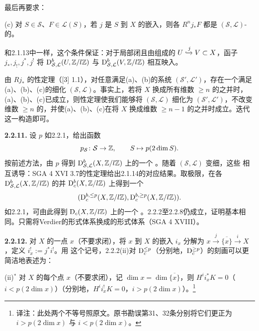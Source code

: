 最后再要求：

(c) 对 $S\in\mathcal S$、$F\in\mathcal L(S)$，若 $j$ 是 $S$ 到 $X$ 的嵌入，则各 $R^nj_*F$ 都是 $(\mathcal S,\mathcal L)$-的。

和2.1.13中一样，这个条件保证：对于局部闭且由组成的 $U\xhookrightarrow{j}V\subset X$，函子 $j_*,j_!,j^*,j^!$ 将 $\mathrm{D}_{\mathcal S,\mathcal L}^b(U,\mathbb Z/l\mathbb Z)$ 与 $\mathrm{D}_{\mathcal S,\mathcal L}^b(V,\mathbb Z/l\mathbb Z)$ 相互映入。

由 $Rj_*$ 的性定理（[3] 1.1），对任意满足(a)、(b)的系统 $(\mathcal S',\mathcal L')$，存在一个满足(a)、(b)、(c)的细化 $(\mathcal S,\mathcal L)$。事实上，若将 $X$ 换成所有维数 $\geq n$ 的之并时，(a)、(b)、(c)已成立，则性定理使我们能够将 $(\mathcal S,\mathcal L)$ 细化为 $(\mathcal S',\mathcal L')$，不改变维数 $\geq n$ 的，并使(a)、(b)、(c)在将 $X$ 换成维数 $\geq n-1$ 的之并时成立。迭代这一构造即可。

\par\medskip\noindent\textbf{2.2.11.} 设 $p$ 如2.2.1，给出函数
\[
 p_{\mathcal S}\colon\mathcal S\to\mathbb Z,\qquad S\mapsto p(2\dim S).
\]
按前述方法，由 $p$ 得到 $\mathrm{D}_{\mathcal S,\mathcal L}^b(X,\mathbb Z/l\mathbb Z)$ 上的一个 。随着 $(\mathcal S,\mathcal L)$ 变细，这些 相互诱导：SGA 4 XVI 3.7的性定理给出2.1.14的对应结果。取极限，在各 $\mathrm{D}_{\mathcal S,\mathcal L}^b(X,\mathbb Z/l\mathbb Z)$ 的并 $\mathrm{D}_c^b(X,\mathbb Z/l\mathbb Z)$ 上得到一个 
\[
 (\mathrm{D}_c^{b,\leq p}(X,\mathbb Z/l\mathbb Z),\mathrm{D}_c^{b,\geq p}(X,\mathbb Z/l\mathbb Z)).
\]
如2.2.1，可由此得到 $\mathrm{D}_c(X,\mathbb Z/l\mathbb Z)$ 上的一个 。2.2.2至2.2.8仍成立，证明基本相同。只需将Verdier的形式体系换成的形式体系（SGA 4 XVIII）。

\par\medskip\noindent\textbf{2.2.12.} 对 $X$ 的一点 $x$（不要求闭），将 $x$ 到 $X$ 的嵌入 $i_x$ 分解为 $x\xrightarrow{j}\overline{\{x\}}\xrightarrow{i}X$，定义 $i_x^!:=j^*i^!$。用
这个记号，2.2.2(ii)对 $\mathrm{D}_c^{\leq p}$（分别地，$\mathrm{D}_c^{\geq p}$）的刻画可以更简洁地表述为：

(ii)$^*$ 对 $X$ 的每个点 $x$（不要求闭），记 $\dim x=\dim\overline{\{x\}}$，则 $H^ii_x^*K=0$（$i<p(2\dim x)$）（分别地，$H^ii_x^!K=0$，$i>p(2\dim x)$）。\footnote{译注：此处两个不等号照原文。原书勘误第31、32条分别将它们更正为 $i>p(2\dim x)$ 与 $i<p(2\dim x)$。}


